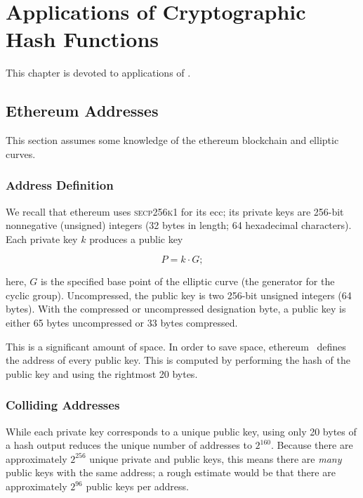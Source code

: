 \chapter{Applications of Cryptographic Hash Functions}
\label{chap:hash_applications}

This chapter is devoted to applications of .



\section{Ethereum Addresses}

This section assumes some knowledge of the \gls{ethereum} blockchain and
\glspl{elliptic curve}.

\subsection{Address Definition}

We recall that \gls{ethereum} uses \textsc{secp256k1}
for its \gls{ecc};
its private keys are 256-bit nonnegative (unsigned) integers
(32 bytes in length; 64 hexadecimal characters).
Each private key $k$ produces a public key

\begin{equation}
    P = k\cdot G;
\end{equation}

\noindent
here, $G$ is the specified base point of the \gls{elliptic curve}
(the generator for the \gls{cyclic group}).
Uncompressed, the public key is two 256-bit unsigned integers
(64 bytes).
With the compressed or uncompressed designation byte,
a public key is either 65 bytes uncompressed or 33 bytes compressed.

This is a significant amount of space.
In order to save space, \gls{ethereum}~\cite[Eq.~314]{EthereumYellowpaper}
defines the address of every public key.
This is computed by performing the \Keccak{} hash of the public key
and using the rightmost 20 bytes.

\subsection{Colliding Addresses}

While each private key corresponds to a unique public key,
using only 20 bytes of a hash output reduces the unique
number of addresses to $2^{160}$.
Because there are approximately $2^{256}$ unique private and public keys,
this means there are \emph{many} public keys with the same address;
a rough estimate would be that there are approximately $2^{96}$ public keys
per address.

